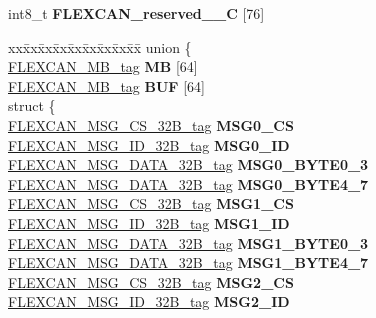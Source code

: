 \begin{DoxyCompactItemize}
\begin{tabbing}
\end{tabbing}\item 
\mbox{\label{structFLEXCAN__struct__tag_a11db135a620c28b3388a33f799976d07}} 
int8\+\_\+t {\bfseries F\+L\+E\+X\+C\+A\+N\+\_\+reserved\+\_\+\_\+C} \mbox{[}76\mbox{]}
\item 
\mbox{\label{structFLEXCAN__struct__tag_a91ba816cb900210de126ef0b6f681da4}} 
\begin{tabbing}
xx\=xx\=xx\=xx\=xx\=xx\=xx\=xx\=xx\=\kill
union \{\\
\>\mbox{\hyperlink{structFLEXCAN__MB__struct__tag}{FLEXCAN\_MB\_tag}} {\bfseries MB} \mbox{[}64\mbox{]}\\
\>\mbox{\hyperlink{structFLEXCAN__MB__struct__tag}{FLEXCAN\_MB\_tag}} {\bfseries BUF} \mbox{[}64\mbox{]}\\
\mbox{\label{unionFLEXCAN__struct__tag_1_1_0D2358_a3a0ca785397504493d6f79dc5558b295}} 
\>struct \{\\
\>\>\mbox{\hyperlink{unionFLEXCAN__MSG__CS__32B__tag}{FLEXCAN\_MSG\_CS\_32B\_tag}} {\bfseries MSG0\_CS}\\
\>\>\mbox{\hyperlink{unionFLEXCAN__MSG__ID__32B__tag}{FLEXCAN\_MSG\_ID\_32B\_tag}} {\bfseries MSG0\_ID}\\
\>\>\mbox{\hyperlink{unionFLEXCAN__MSG__DATA__32B__tag}{FLEXCAN\_MSG\_DATA\_32B\_tag}} {\bfseries MSG0\_BYTE0\_3}\\
\>\>\mbox{\hyperlink{unionFLEXCAN__MSG__DATA__32B__tag}{FLEXCAN\_MSG\_DATA\_32B\_tag}} {\bfseries MSG0\_BYTE4\_7}\\
\>\>\mbox{\hyperlink{unionFLEXCAN__MSG__CS__32B__tag}{FLEXCAN\_MSG\_CS\_32B\_tag}} {\bfseries MSG1\_CS}\\
\>\>\mbox{\hyperlink{unionFLEXCAN__MSG__ID__32B__tag}{FLEXCAN\_MSG\_ID\_32B\_tag}} {\bfseries MSG1\_ID}\\
\>\>\mbox{\hyperlink{unionFLEXCAN__MSG__DATA__32B__tag}{FLEXCAN\_MSG\_DATA\_32B\_tag}} {\bfseries MSG1\_BYTE0\_3}\\
\>\>\mbox{\hyperlink{unionFLEXCAN__MSG__DATA__32B__tag}{FLEXCAN\_MSG\_DATA\_32B\_tag}} {\bfseries MSG1\_BYTE4\_7}\\
\>\>\mbox{\hyperlink{unionFLEXCAN__MSG__CS__32B__tag}{FLEXCAN\_MSG\_CS\_32B\_tag}} {\bfseries MSG2\_CS}\\
\>\>\mbox{\hyperlink{unionFLEXCAN__MSG__ID__32B__tag}{FLEXCAN\_MSG\_ID\_32B\_tag}} {\bfseries MSG2\_ID}\\

\end{tabbing}
\end{DoxyCompactItemize}
